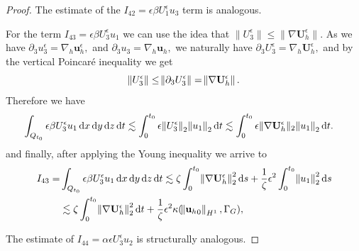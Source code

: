 \documentclass[11pt, a4paper]{article}
\newcommand*\diff{\mathop{}\!\mathrm{d}}
\begin{document}
\begin{proof}
 The estimate of the $ I_{42} = \epsilon \beta U_1^\epsilon u_3$ term is analogous.

 For the term $ I_{43} = \epsilon \beta U_3^\epsilon u_1$ we can use the idea that $\| U_3^\epsilon \| \leq \| \nabla \mathbf{U}_h^\epsilon \|.$ As we have $\partial_3 u_3^\epsilon = \nabla_h \mathbf{u}_h^\epsilon,$ and $\partial_3 u_3 = \nabla_h \mathbf{u}_h,$ we naturally have $\partial_3 U_3^\epsilon = \nabla_h \mathbf{U}_h^\epsilon,$ and by the vertical Poincar\'e inequality we get
 $$\norm{U_3^\epsilon} \leq \norm{\partial_3 U_3^\epsilon} = \norm{\nabla \mathbf{U}_h^\epsilon}.$$ 
Therefore we have
$$ \hspace{-1em}\int_{Q_{t_0}} \epsilon \beta U_3^\epsilon u_1 \diff x \diff y \diff z \diff t \lesssim \int_0^{t_0} \epsilon \norm{U_3^\epsilon}_2 \norm{u_1}_2 \diff t \lesssim \int_0^{t_0} \epsilon \| \nabla \mathbf{U}_h^\epsilon \|_2 \norm{u_1}_2 \diff t.$$
%
and finally, after applying the Young inequality we arrive to
%
\begin{equation}
\begin{split}
I_{43} = & \int_{Q_{t_0}} \epsilon \beta U_3^\epsilon u_1 \diff x \diff y \diff z \diff t \lesssim \zeta \int_0^{t_0} \norm{\nabla \mathbf{U}_h^\epsilon}_2^2 \diff s + \frac{1}{\zeta} \epsilon^2 \int_0^{t_0} \norm{u_1}_2^2 \diff s \\
& \lesssim \zeta \int_0^{t_0} \norm{\nabla \mathbf{U}_h^\epsilon}_2^2 \diff t + \frac{1}{\zeta} \epsilon^2 \kappa (\norm{{\mathbf{u}_h}_0}_{H^1}, \Gamma_G),
\end{split}
\end{equation}
%

 The estimate of $ I_{44} = \alpha \epsilon U_3^\epsilon u_2$ is structurally analogous.



\end{proof}
\end{document}
